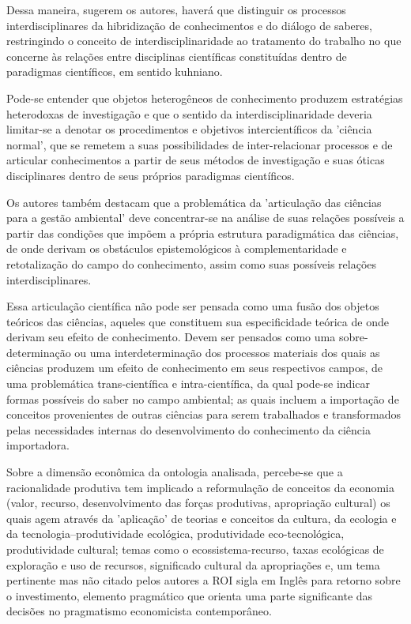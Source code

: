 \documentclass[
   article,       %
   12pt,          %
   oneside,       %
   a4paper,       %
   english,       %
   brazil,           %
   sumario=tradicional
   ]{abntex2}
\begin{document}
Dessa maneira, sugerem os autores, haverá que distinguir os processos interdisciplinares da hibridização de conhecimentos e do diálogo de saberes, restringindo o conceito de interdisciplinaridade ao tratamento do trabalho no que concerne às relações entre disciplinas científicas constituídas dentro de paradigmas científicos, em sentido kuhniano.

Pode-se entender que objetos heterogêneos de conhecimento produzem estratégias heterodoxas de investigação e que o sentido da interdisciplinaridade deveria limitar-se a denotar os procedimentos e objetivos intercientíficos da 'ciência normal', que se remetem a suas possibilidades de inter-relacionar processos e de articular conhecimentos a partir de seus métodos de investigação e suas óticas disciplinares dentro de seus próprios paradigmas científicos. 

Os autores também destacam que a problemática da 'articulação das ciências para a gestão ambiental' deve concentrar-se na análise de suas relações possíveis a partir das condições que impõem a própria estrutura paradigmática das ciências, de onde derivam os obstáculos epistemológicos à complementaridade e retotalização do campo do conhecimento, assim como suas possíveis relações interdisciplinares. 

Essa articulação científica não pode ser pensada como uma fusão dos objetos teóricos das ciências, aqueles que constituem sua especificidade teórica de onde derivam seu efeito de conhecimento. Devem ser pensados como uma sobre-determinação ou uma interdeterminação dos processos materiais dos quais as ciências produzem um efeito de conhecimento em seus respectivos campos, de uma problemática trans-científica e intra-científica, da qual pode-se indicar  formas possíveis do saber no campo ambiental; as quais incluem a importação de conceitos provenientes de outras ciências para serem trabalhados e transformados pelas necessidades internas do desenvolvimento do conhecimento da ciência importadora.

Sobre a dimensão econômica da ontologia analisada, percebe-se que a racionalidade produtiva tem implicado a reformulação de conceitos da economia (valor, recurso, desenvolvimento das forças produtivas, apropriação cultural) os quais agem através da 'aplicação' de teorias e conceitos da cultura, da ecologia e da tecnologia–produtividade ecológica, produtividade eco-tecnológica, produtividade cultural; temas como o  ecossistema-recurso, taxas ecológicas de exploração e uso de recursos, significado cultural da apropriações e, um tema pertinente mas não citado pelos autores a ROI sigla em Inglês para retorno sobre o investimento, elemento pragmático que orienta uma parte significante das decisões no pragmatismo economicista contemporâneo.
\end{document}
